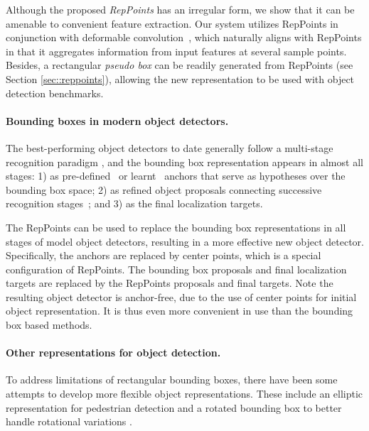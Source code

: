 \documentclass[10pt,twocolumn,letterpaper]{article}
\begin{document}
Although the proposed \textit{RepPoints} has an irregular form, we show that it can be amenable to convenient feature extraction. Our system utilizes RepPoints in conjunction with deformable convolution~\cite{DCN}, which naturally aligns with RepPoints in that it aggregates information from input features at several sample points. Besides, a rectangular \textit{pseudo box} can be readily generated from RepPoints (see Section \ref{sec::reppoints}), allowing the new representation to be used with object detection benchmarks. 

\vspace{-10pt}
\paragraph{Bounding boxes in modern object detectors.}
The best-performing object detectors to date generally follow a multi-stage recognition paradigm \cite{FPN,DCN,Mask-rcnn,li2017light,Cascade-rcnn,SNIP,PA-Net}, and the bounding box representation appears in almost all stages: 1) as pre-defined~\cite{ren2015faster,RetinaNet} or learnt~\cite{GuidedAnchoring,MetaAnchor,zhong2018anchor} anchors that serve as hypotheses over the bounding box space; 2) as refined object proposals connecting successive recognition stages~\cite{ren2015faster,Cascade-rcnn}; and 3) as the final localization targets.

The RepPoints can be used to replace the bounding box representations in all stages of model object detectors, resulting in a more effective new object detector. Specifically, the anchors are replaced by center points, which is a special configuration of RepPoints. The bounding box proposals and final localization targets are replaced by the RepPoints proposals and final targets. Note the resulting object detector is anchor-free, due to the use of center points for initial object representation. It is thus even more convenient in use than the bounding box based methods.


\vspace{-10pt}
\paragraph{Other representations for object detection.}

To address limitations of rectangular bounding boxes, there have been some attempts to develop more flexible object representations. These include an elliptic representation for pedestrian detection \cite{leibe2005pedestrian} and a rotated bounding box to better handle rotational variations \cite{huang2007high,zhou2017oriented}.
\end{document}
